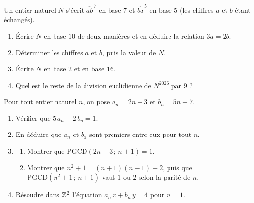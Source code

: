 Un entier naturel $N$ s'écrit $\overline{ab}^{\,7}$ en base $7$ et
$\overline{ba}^{\,5}$ en base $5$ (les chiffres $a$ et $b$ étant échangés).
\begin{enumerate}
	\item Écrire $N$ en base $10$ de deux manières et en déduire la relation
	$3a = 2b$.
	\item Déterminer les chiffres $a$ et $b$, puis la valeur de $N$.
	\item Écrire $N$ en base $2$ et en base $16$.
	\item Quel est le reste de la division euclidienne de $N^{2026}$ par $9$ ?
\end{enumerate}

Pour tout entier naturel $n$, on pose $a_n = 2n + 3$ et $b_n = 5n + 7$.
\begin{enumerate}
	\item Vérifier que $5\,a_n - 2\,b_n = 1$.
	\item En déduire que $a_n$ et $b_n$ sont premiers entre eux pour tout $n$.
	\item
	\begin{enumerate}
		\item Montrer que $\mathrm{PGCD}(2n + 3\,;\,n + 1) = 1$.
		\item Montrer que $n^2 + 1 = (n + 1)(n - 1) + 2$, puis que
		$\mathrm{PGCD}(n^2 + 1\,;\,n + 1)$ vaut $1$ ou $2$ selon la parité de $n$.
	\end{enumerate}
	\item Résoudre dans $\mathbb{Z}^2$ l'équation $a_n\,x + b_n\,y = 4$ pour $n = 1$.
\end{enumerate}
